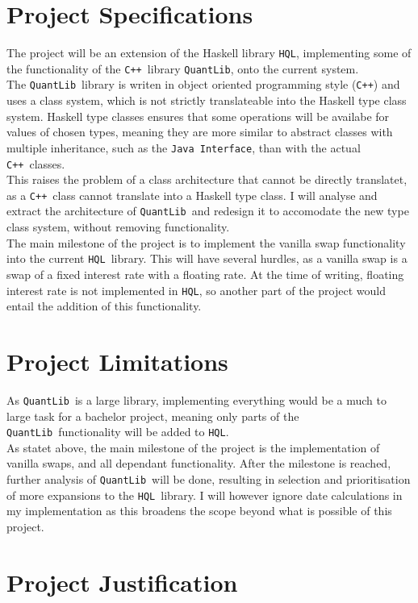 \documentclass{article}
\newcommand{\HQL}{\texttt{HQL}}
\newcommand{\QL}{\texttt{QuantLib}}
\newcommand{\Cpp}{\texttt{C++}}
\begin{document}
\section{Project Specifications}
The project will be an extension of the Haskell library \HQL, implementing 
some of the functionality of the \Cpp\ library \QL\cite{QULI}, onto the current system.\\
The \QL\ library is writen in object oriented programming style (\Cpp) and uses a class system, 
which is not strictly translateable into the Haskell type class system.
Haskell type classes ensures that some operations will be availabe for values of chosen types, meaning they are
more similar to abstract classes with multiple inheritance, such as the \texttt{Java Interface}, 
than with the actual \Cpp\ classes. \\
This raises the problem of a class architecture that cannot be directly translatet, as a \Cpp\ class cannot translate
into a Haskell type class. I will analyse and extract the architecture of \QL\ and redesign it to accomodate
the new type class system, without removing functionality.\\
The main milestone of the project is to implement the vanilla swap functionality into the
current \HQL\ library. This will have several hurdles, as a vanilla swap is a swap of a fixed interest
rate with a floating rate. At the time of writing, floating interest rate is not implemented in \HQL, so 
another part of the project would entail the addition of this functionality. \\

\section{Project Limitations}
As \QL\ is a large library, implementing everything would be a much to large task
for a bachelor project, meaning only parts of the \QL\ functionality will be added to \HQL.\\
As statet above, the main milestone of the project is the implementation of vanilla swaps, and
all dependant functionality. After the milestone is reached, further analysis 
of \QL\ will be done, resulting in selection and prioritisation of more expansions to the \HQL\ library.
I will however ignore date calculations in my implementation as this broadens the scope beyond what is 
possible of this project. 

\section{Project Justification}
\end{document}
